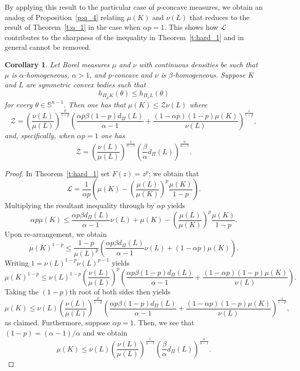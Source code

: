 \documentclass[11pt]{amsart}
\newtheorem{corollary}[theorem]{Corollary}
\theoremstyle{definition}
\theoremstyle{remark}
\numberwithin{equation}{section}
\newcommand{\s}{\mathbb{S}}
\begin{document}
By applying this result to the particular case of $p$-concave measures, we obtain an analog of Proposition~\ref{p:q_4} relating $\mu(K)$ and $\nu(L)$ that reduces to the result of Theorem~\ref{t:q_1} in the case when $\alpha p=1$. This shows how $\mathcal{L}$ contributes to the sharpness of the inequality in Theorem~\ref{t:hard_1} and in general cannot be removed.
\begin{corollary}
\label{cor:hard_2}
Let Borel measures $\mu$ and $\nu$ with continuous densities be such that $\mu$ is $\alpha$-homogeneous, $\alpha>1$, and $p$-concave and $\nu$ is $\beta$-homogeneous. Suppose $K$ and $L$ are symmetric convex bodies such that $$h_{\Pi_{\mu} K}(\theta) \le h_{\Pi_{\nu} L}(\theta)$$ for every $\theta\in\s^{n-1}.$ Then one has that
$\mu(K) \le \mathcal{Z} \nu(L)$
where
$$\mathcal{Z}= \left(\frac{\nu(L)}{\mu(L)}\right)^\frac{p}{1-p}\left(\frac{\alpha p\beta(1-p) d_{\Pi}(L)}{\alpha-1}+\frac{(1-\alpha p)(1-p)\mu(K)}{\nu(L)}\right)^{\frac{1}{1-p}},$$
and, specifically, when $\alpha p=1$ one has
$$\mathcal{Z}=\left(\frac{\nu(L)}{\mu(L)}\right)^\frac{1}{\alpha-1}\left(\frac{\beta }{\alpha}d_{\Pi}(L)\right)^{\frac{\alpha}{\alpha-1}}.$$
\end{corollary}
\begin{proof}
In Theorem~\ref{t:hard_1} set $F(z)=z^p$; we obtain that
$$\mathcal{L}=\frac{1}{\alpha p}\left(\mu(K)-\left(\frac{\mu(L)}{\mu(K)}\right)^p\frac{\mu(K)}{1-p}\right).$$
Multiplying the resultant inequality through by $\alpha p$ yields
$$\alpha p\mu(K)\leq \frac{\alpha p\beta d_{\Pi}(L)}{\alpha-1}\nu(L)+\mu(K)-\left(\frac{\mu(L)}{\mu(K)}\right)^p\frac{\mu(K)}{1-p}.$$
Upon re-arrangement, we obtain
$$\mu(K)^{1-p}\leq \frac{1-p}{\mu(L)^p}\left(\frac{\alpha p\beta d_{\Pi}(L)}{\alpha-1}\nu(L)+(1-\alpha p)\mu(K)\right).$$
Writing $1=\nu(L)^{1-p}\nu(L)^{p-1}$ yields
$$\mu(K)^{1-p}\leq \nu(L)^{1-p}\left(\frac{\nu(L)}{\mu(L)}\right)^p\left(\frac{\alpha p\beta(1-p) d_{\Pi}(L)}{\alpha-1}+\frac{(1-\alpha p)(1-p)\mu(K)}{\nu(L)}\right).$$
Taking the $(1-p)$th root of both sides then yields
$$\mu(K)\leq \nu(L)\left(\frac{\nu(L)}{\mu(L)}\right)^\frac{p}{1-p}\left(\frac{\alpha p\beta(1-p) d_{\Pi}(L)}{\alpha-1}+\frac{(1-\alpha p)(1-p)\mu(K)}{\nu(L)}\right)^{\frac{1}{1-p}},$$
as claimed. Furthermore, suppose $\alpha p=1$. Then, we see that $(1-p)=(\alpha-1)/\alpha$ and we obtain
$$\mu(K)\leq \nu(L)\left(\frac{\nu(L)}{\mu(L)}\right)^\frac{1}{\alpha-1}\left(\frac{\beta }{\alpha}d_{\Pi}(L)\right)^{\frac{\alpha}{\alpha-1}}.$$
\end{proof}
\end{document}
